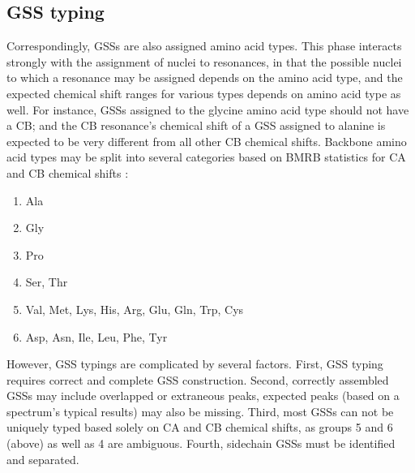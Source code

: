 \subsection*{GSS typing}
Correspondingly, GSSs are also assigned amino acid types.  This phase 
interacts strongly with the assignment of nuclei to resonances, in 
that the possible nuclei to which a resonance may be assigned depends 
on the amino acid type, and the expected chemical shift ranges for various 
types depends on amino acid type as well.  For instance, GSSs assigned 
to the glycine amino acid type should not have a CB; and the CB resonance's 
chemical shift of a GSS assigned to alanine is expected to be very different 
from all other CB chemical shifts.  Backbone amino acid types may be split 
into several categories \cite{saga} based on BMRB statistics for 
CA and CB chemical shifts \cite{bmrb}:
\begin{enumerate}
  \item Ala
  \item Gly 
  \item Pro
  \item Ser, Thr
  \item Val, Met, Lys, His, Arg, Glu, Gln, Trp, Cys
  \item Asp, Asn, Ile, Leu, Phe, Tyr
\end{enumerate}
However, GSS typings are complicated by several factors.  First, GSS typing 
requires correct and complete GSS construction.  Second, correctly assembled 
GSSs may include overlapped or extraneous peaks, expected peaks (based on a 
spectrum's typical results) may also be missing.  Third, most GSSs can not 
be uniquely typed based solely on CA and CB chemical shifts, as groups 5 and 
6 (above) as well as 4 are ambiguous.  Fourth, sidechain GSSs must be 
identified and separated.

